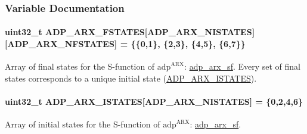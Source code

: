 \subsubsection{\-Variable \-Documentation}
\hypertarget{adp-arx_8cc_af70040b1b46c82f1fbe37b5bab89d7db}{
\paragraph[{\-A\-D\-P\-\_\-\-A\-R\-X\-\_\-\-F\-S\-T\-A\-T\-E\-S}]{\setlength{\rightskip}{0pt plus 5cm}uint32\-\_\-t {\bf \-A\-D\-P\-\_\-\-A\-R\-X\-\_\-\-F\-S\-T\-A\-T\-E\-S}\mbox{[}{\bf \-A\-D\-P\-\_\-\-A\-R\-X\-\_\-\-N\-I\-S\-T\-A\-T\-E\-S}\mbox{]}\mbox{[}{\bf \-A\-D\-P\-\_\-\-A\-R\-X\-\_\-\-N\-F\-S\-T\-A\-T\-E\-S}\mbox{]} = \{\{0,1\}, \{2,3\}, \{4,5\}, \{6,7\}\}}}\label{adp-arx_8cc_af70040b1b46c82f1fbe37b5bab89d7db}
\-Array of final states for the \-S-\/function of $\mathrm{adp}^{\mathrm{ARX}}$\-: \hyperlink{adp-arx_8hh_afa557fabb780c1febded3e85fe3c7510}{adp\-\_\-arx\-\_\-sf}. \-Every set of final states corresponds to a unique initial state (\hyperlink{adp-arx_8hh_a94f941841e2bc961bc9abd1c7e0b8513}{\-A\-D\-P\-\_\-\-A\-R\-X\-\_\-\-I\-S\-T\-A\-T\-E\-S}). \hypertarget{adp-arx_8cc_a94f941841e2bc961bc9abd1c7e0b8513}{
\paragraph[{\-A\-D\-P\-\_\-\-A\-R\-X\-\_\-\-I\-S\-T\-A\-T\-E\-S}]{\setlength{\rightskip}{0pt plus 5cm}uint32\-\_\-t {\bf \-A\-D\-P\-\_\-\-A\-R\-X\-\_\-\-I\-S\-T\-A\-T\-E\-S}\mbox{[}{\bf \-A\-D\-P\-\_\-\-A\-R\-X\-\_\-\-N\-I\-S\-T\-A\-T\-E\-S}\mbox{]} = \{0,2,4,6\}}}\label{adp-arx_8cc_a94f941841e2bc961bc9abd1c7e0b8513}
\-Array of initial states for the \-S-\/function of $\mathrm{adp}^{\mathrm{ARX}}$\-: \hyperlink{adp-arx_8hh_afa557fabb780c1febded3e85fe3c7510}{adp\-\_\-arx\-\_\-sf}. 